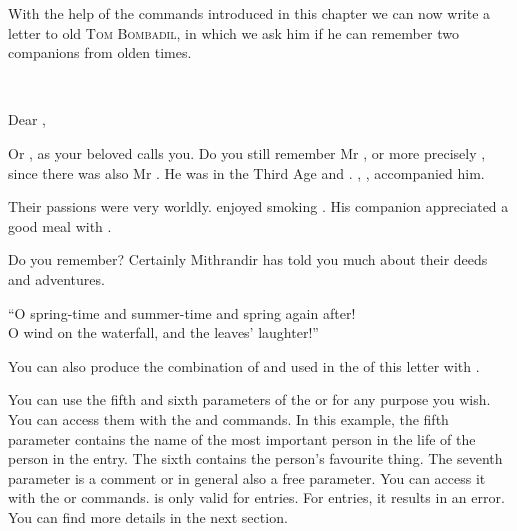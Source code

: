 \BeginIndexGroup
{}%
%
%
%
%
%
%
%
%
With the help of the commands introduced in this chapter we can now write a
letter to old \textsc{Tom Bombadil}, in which we ask him if he can remember
two companions from olden times.
\begin{lstcode}
  \begin{letter}{\\}
     \opening{Dear  ,}
     
     Or , as your beloved  calls you. Do
     you still remember Mr , or more precisely
     , since there was also Mr . He was
      in the Third Age and . ,
     , accompanied him.
      
      Their passions were very worldly.  enjoyed
      smoking . His companion appreciated a good meal
      with .

      Do you remember? Certainly Mithrandir has told you much
      about their deeds and adventures.
    \closing{``O spring-time and summer-time
                and spring again after!\\
               O wind on the waterfall,
                and the leaves' laughter!''}
  \end{letter}
\end{lstcode}
You can also produce the combination of  and
 used in the  of
this letter with .

You can use the fifth and sixth parameters of the
 or  for any
purpose you wish. You can access them with the  and
 commands. In this example, the fifth parameter contains the
name of the most important person in the life of the person in the entry. The
sixth contains the person's favourite thing. The seventh parameter is a
comment or in general also a free parameter. You can access it with the
 or  commands.  is only valid for
 entries. For
 entries, it results in an error. You can
find more details in the next section.
%
\EndIndexGroup
\EndIndexGroup


